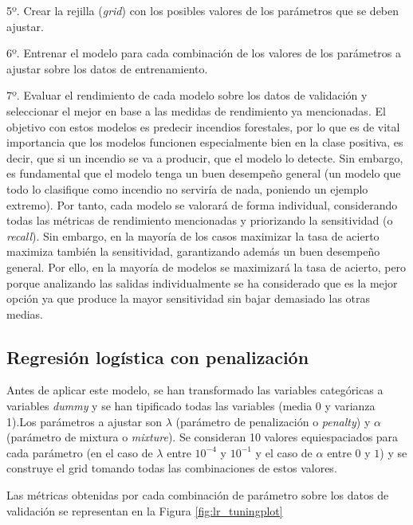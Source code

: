 \documentclass[12pt,a4paper,]{book}
\newcounter{dummy}
\numberwithin{dummy}{section}
\theoremstyle{ocrenumbox}
\theoremstyle{blacknumex}
\theoremstyle{blacknumbox}
\theoremstyle{ocrenum}
\theoremstyle{ocrenum}
\begin{document}
5º. Crear la rejilla (\emph{grid}) con los posibles valores de los
parámetros que se deben ajustar.

6º. Entrenar el modelo para cada combinación de los valores de los
parámetros a ajustar sobre los datos de entrenamiento.

7º. Evaluar el rendimiento de cada modelo sobre los datos de validación
y seleccionar el mejor en base a las medidas de rendimiento ya
mencionadas. El objetivo con estos modelos es predecir incendios
forestales, por lo que es de vital importancia que los modelos funcionen
especialmente bien en la clase positiva, es decir, que si un incendio se
va a producir, que el modelo lo detecte. Sin embargo, es fundamental que
el modelo tenga un buen desempeño general (un modelo que todo lo
clasifique como incendio no serviría de nada, poniendo un ejemplo
extremo). Por tanto, cada modelo se valorará de forma individual,
considerando todas las métricas de rendimiento mencionadas y priorizando
la sensitividad (o \emph{recall}). Sin embargo, en la mayoría de los
casos maximizar la tasa de acierto maximiza también la sensitividad,
garantizando además un buen desempeño general. Por ello, en la mayoría
de modelos se maximizará la tasa de acierto, pero porque analizando las
salidas individualmente se ha considerado que es la mejor opción ya que
produce la mayor sensitividad sin bajar demasiado las otras medias.

\hypertarget{regresiuxf3n-loguxedstica-con-penalizaciuxf3n}{%
\subsection{Regresión logística con
penalización}\label{regresiuxf3n-loguxedstica-con-penalizaciuxf3n}}

Antes de aplicar este modelo, se han transformado las variables
categóricas a variables \emph{dummy} y se han tipificado todas las
variables (media 0 y varianza 1).Los parámetros a ajustar son
\(\lambda\) (parámetro de penalización o \emph{penalty}) y \(\alpha\)
(parámetro de mixtura o \emph{mixture}). Se consideran 10 valores
equiespaciados para cada parámetro (en el caso de \(\lambda\) entre
\(10^{-4}\) y \(10^{-1}\) y el caso de \(\alpha\) entre \(0\) y \(1\)) y
se construye el grid tomando todas las combinaciones de estos valores.

Las métricas obtenidas por cada combinación de parámetro sobre los datos
de validación se representan en la Figura \ref{fig:lr_tuningplot}
\end{document}
